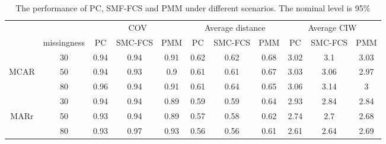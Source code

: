 \documentclass[12pt, fullpage, a4paper]{article}
\begin{document}
\begin{table}
	\begin{tabular}{cc|ccc|ccc|ccc}
		\multicolumn{2}{l}{}                    & \multicolumn{3}{c|}{COV} & \multicolumn{3}{c|}{Average distance} & \multicolumn{3}{c}{Average CIW} \\ \cline{2-11} 
		\multicolumn{1}{c|}{}     & missingness & PC    & SMC-FCS  & PMM   & PC         & SMC-FCS      & PMM       & PC       & SMC-FCS    & PMM     \\
		\multicolumn{1}{c|}{}     & 30          & 0.94  & 0.94     & 0.91  & 0.62       & 0.62         & 0.68      & 3.02     & 3.1        & 3.03    \\
		\multicolumn{1}{c|}{MCAR} & 50          & 0.94  & 0.93     & 0.9   & 0.61       & 0.61         & 0.67      & 3.03     & 3.06       & 2.97    \\
		\multicolumn{1}{c|}{}     & 80          & 0.96  & 0.94     & 0.91  & 0.61       & 0.64         & 0.65      & 3.06     & 3.14       & 3       \\ \hline
		\multicolumn{1}{c|}{}     & 30          & 0.94  & 0.94     & 0.89  & 0.59       & 0.59         & 0.64      & 2.93     & 2.84       & 2.84    \\
		\multicolumn{1}{c|}{MARr} & 50          & 0.93  & 0.94     & 0.89  & 0.57       & 0.58         & 0.62      & 2.74     & 2.7        & 2.68    \\
		\multicolumn{1}{c|}{}     & 80          & 0.93  & 0.97     & 0.93  & 0.56       & 0.56         & 0.61      & 2.61     & 2.64       & 2.69   
	\end{tabular}
	\caption{The performance of PC, SMF-FCS and PMM under different scenarios. The nominal level is 95\%}
	\label{tab2}
\end{table}
\end{document}
